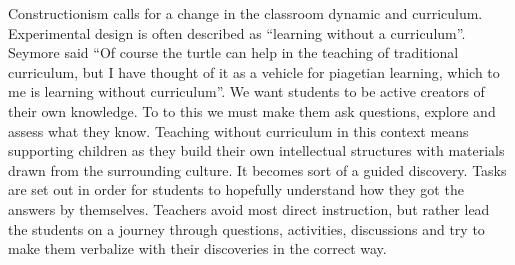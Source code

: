 \bigskip\noindent
Constructionism calls for a change in the classroom dynamic and curriculum. Experimental design is often described as ``learning without a curriculum''. Seymore said ``Of course the turtle can help in the teaching of traditional curriculum, but I have thought of it as a vehicle for piagetian learning, which to me is learning without curriculum''. We want students to be active creators of their own knowledge. To to this we must make them ask questions, explore and assess what they know. Teaching without curriculum in this context means supporting children as they build their own intellectual structures with materials drawn from the surrounding culture. It becomes sort of a guided discovery. Tasks are set out in order for students to hopefully understand how they got the answers by themselves. Teachers avoid most direct instruction, but rather lead the students on a journey through questions, activities, discussions and try to make them verbalize with their discoveries in the correct way.